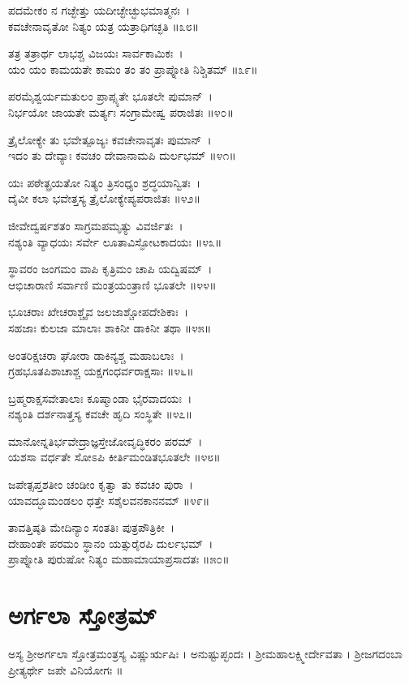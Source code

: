 ಪದಮೇಕಂ ನ ಗಚ್ಛೇತ್ತು ಯದೀಚ್ಛೇಚ್ಛುಭಮಾತ್ಮನಃ~।\\
ಕವಚೇನಾವೃತೋ ನಿತ್ಯಂ ಯತ್ರ ಯತ್ರಾಧಿಗಚ್ಛತಿ ॥೩೮॥

ತತ್ರ ತತ್ರಾರ್ಥ ಲಾಭಶ್ಚ ವಿಜಯಃ ಸಾರ್ವಕಾಮಿಕಃ~।\\
ಯಂ ಯಂ ಕಾಮಯತೇ ಕಾಮಂ ತಂ ತಂ ಪ್ರಾಪ್ನೋತಿ ನಿಶ್ಚಿತಮ್ ॥೩೯॥

ಪರಮೈಶ್ವರ್ಯಮತುಲಂ ಪ್ರಾಪ್ಸ್ಯತೇ ಭೂತಲೇ ಪುಮಾನ್~।\\
ನಿರ್ಭಯೋ ಜಾಯತೇ ಮರ್ತ್ಯಃ ಸಂಗ್ರಾಮೇಷ್ವ ಪರಾಜಿತಃ ॥೪೦॥

ತ್ರೈಲೋಕ್ಯೇ ತು ಭವೇತ್ಪೂಜ್ಯಃ ಕವಚೇನಾವೃತಃ ಪುಮಾನ್~।\\
ಇದಂ ತು ದೇವ್ಯಾಃ ಕವಚಂ ದೇವಾನಾಮಪಿ ದುರ್ಲಭಮ್ ॥೪೧॥

ಯಃ ಪಠೇತ್ಪ್ರಯತೋ ನಿತ್ಯಂ ತ್ರಿಸಂಧ್ಯಂ ಶ್ರದ್ಧಯಾನ್ವಿತಃ~।\\
ದೈವೀ ಕಲಾ ಭವೇತ್ತಸ್ಯ ತ್ರೈಲೋಕ್ಯೇಪ್ಯಪರಾಜಿತಃ ॥೪೨॥

ಜೀವೇದ್ವರ್ಷಶತಂ ಸಾಗ್ರಮಪಮೃತ್ಯು ವಿವರ್ಜಿತಃ~।\\
ನಶ್ಯಂತಿ ವ್ಯಾಧಯಃ ಸರ್ವೇ ಲೂತಾವಿಸ್ಫೋಟಕಾದಯಃ ॥೪೩॥

ಸ್ಥಾವರಂ ಜಂಗಮಂ ವಾಪಿ ಕೃತ್ರಿಮಂ ಚಾಪಿ ಯದ್ವಿಷಮ್~।\\
ಆಭಿಚಾರಾಣಿ ಸರ್ವಾಣಿ ಮಂತ್ರಯಂತ್ರಾಣಿ ಭೂತಲೇ ॥೪೪॥

ಭೂಚರಾಃ ಖೇಚರಾಶ್ಚೈವ ಜಲಜಾಶ್ಚೋಪದೇಶಿಕಾಃ~।\\
ಸಹಜಾಃ ಕುಲಜಾ ಮಾಲಾಃ ಶಾಕಿನೀ ಡಾಕಿನೀ ತಥಾ ॥೪೫॥

ಅಂತರಿಕ್ಷಚರಾ ಘೋರಾ ಡಾಕಿನ್ಯಶ್ಚ ಮಹಾಬಲಾಃ~।\\
ಗ್ರಹಭೂತಪಿಶಾಚಾಶ್ಚ ಯಕ್ಷಗಂಧರ್ವರಾಕ್ಷಸಾಃ ॥೪೬॥

ಬ್ರಹ್ಮರಾಕ್ಷಸವೇತಾಲಾಃ ಕೂಷ್ಮಾಂಡಾ ಭೈರವಾದಯಃ~।\\
ನಶ್ಯಂತಿ ದರ್ಶನಾತ್ತಸ್ಯ ಕವಚೇ ಹೃದಿ ಸಂಸ್ಥಿತೇ ॥೪೭॥

ಮಾನೋನ್ನತಿರ್ಭವೇದ್ರಾಜ್ಞಸ್ತೇಜೋವೃದ್ಧಿಕರಂ ಪರಮ್~।\\
ಯಶಸಾ ವರ್ಧತೇ ಸೋಽಪಿ ಕೀರ್ತಿಮಂಡಿತಭೂತಲೇ ॥೪೮॥

ಜಪೇತ್ಸಪ್ತಶತೀಂ ಚಂಡೀಂ ಕೃತ್ವಾ ತು ಕವಚಂ ಪುರಾ~।\\
ಯಾವದ್ಭೂಮಂಡಲಂ ಧತ್ತೇ ಸಶೈಲವನಕಾನನಮ್ ॥೪೯॥

ತಾವತ್ತಿಷ್ಠತಿ ಮೇದಿನ್ಯಾಂ ಸಂತತಿಃ ಪುತ್ರಪೌತ್ರಿಕೀ~।\\
ದೇಹಾಂತೇ ಪರಮಂ ಸ್ಥಾನಂ ಯತ್ಸುರೈರಪಿ ದುರ್ಲಭಮ್~।\\
ಪ್ರಾಪ್ನೋತಿ ಪುರುಷೋ ನಿತ್ಯಂ ಮಹಾಮಾಯಾಪ್ರಸಾದತಃ ॥೫೦॥
\section{ಅರ್ಗಲಾ ಸ್ತೋತ್ರಮ್}
ಅಸ್ಯ ಶ್ರೀಅರ್ಗಲಾ ಸ್ತೋತ್ರಮಂತ್ರಸ್ಯ ವಿಷ್ಣುರ್ಋಷಿಃ । ಅನುಷ್ಟುಪ್ಛಂದಃ ।  ಶ್ರೀಮಹಾಲಕ್ಷ್ಮೀರ್ದೇವತಾ ।  ಶ್ರೀಜಗದಂಬಾ ಪ್ರೀತ್ಯರ್ಥೇ ಜಪೇ ವಿನಿಯೋಗಃ ॥

